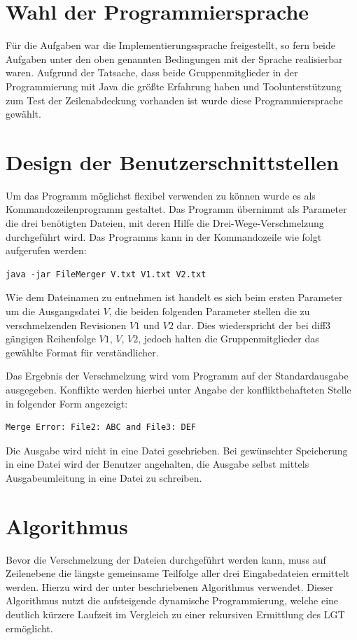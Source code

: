 \documentclass[a4paper,titlepage,12pt]{scrartcl}
\begin{document}
\section{Wahl der Programmiersprache}
\label{sec:proglang}
Für die Aufgaben war die Implementierungssprache freigestellt, so fern beide Aufgaben unter den oben genannten Bedingungen mit der Sprache realisierbar waren. Aufgrund der Tatsache, dass beide Gruppenmitglieder in der Programmierung mit Java die größte Erfahrung haben und Toolunterstützung zum Test der Zeilenabdeckung vorhanden ist wurde diese Programmiersprache gewählt.

\section{Design der Benutzerschnittstellen}
\label{sec:design}
Um das Programm möglichst flexibel verwenden zu können wurde es als Kommandozeilenprogramm gestaltet.
Das Programm übernimmt als Parameter die drei benötigten Dateien, mit deren Hilfe die Drei-Wege-Verschmelzung durchgeführt wird. Das Programms kann in der Kommandozeile wie folgt aufgerufen werden:

\lstset{language=sh, numbers=none, xleftmargin=0pt}
\begin{lstlisting}
java -jar FileMerger V.txt V1.txt V2.txt
\end{lstlisting}
Wie dem Dateinamen zu entnehmen ist handelt es sich beim ersten Parameter um die Ausgangsdatei $V$,
die beiden folgenden Parameter stellen die zu verschmelzenden Revisionen $V1$ und $V2$ dar.
Dies wiederspricht der bei diff3 gängigen Reihenfolge $V1$, $V$, $V2$, jedoch halten die Gruppenmitglieder das gewählte Format für verständlicher.

Das Ergebnis der Verschmelzung wird vom Programm auf der Standardausgabe ausgegeben. Konflikte werden hierbei unter Angabe der konfliktbehafteten Stelle in folgender Form angezeigt:

\begin{verbatim}
Merge Error: File2: ABC and File3: DEF
\end{verbatim}


Die Ausgabe wird nicht in eine Datei geschrieben. Bei gewünschter Speicherung in eine Datei wird der Benutzer angehalten, die Ausgabe selbst mittels Ausgabeumleitung in eine Datei zu schreiben.

\section{Algorithmus}
\label{sec:algorithm}
Bevor die Verschmelzung der Dateien durchgeführt werden kann, muss auf Zeilenebene die längste gemeinsame Teilfolge aller drei Eingabedateien ermittelt werden. Hierzu wird der unter \citet{www:EP96} beschriebenen Algorithmus verwendet. Dieser Algorithmus nutzt die aufsteigende dynamische Programmierung,
welche eine deutlich kürzere Laufzeit im Vergleich zu einer rekursiven Ermittlung des LGT ermöglicht.
\end{document}
